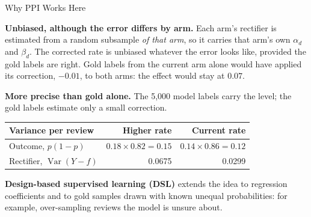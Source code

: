 \documentclass[aspectratio=169, 11pt, handout]{beamer}
\newcommand{\Var}{\operatorname{Var}}
\begin{document}
\begin{frame}{Why PPI Works Here}

\textbf{Unbiased, although the error differs by arm.} Each arm's rectifier is estimated from a random subsample \emph{of that arm}, so it carries that arm's own $\alpha_d$ and $\beta_d$. The corrected rate is unbiased whatever the error looks like, provided the gold labels are right. Gold labels from the current arm alone would have applied its correction, $-0.01$, to both arms: the effect would stay at $0.07$.

\bigskip

\textbf{More precise than gold alone.} The 5{,}000 model labels carry the level; the gold labels estimate only a small correction.

\begin{center}
\small
\begin{tabular}{lrr}
\toprule
\textbf{Variance per review} & \textbf{Higher rate} & \textbf{Current rate} \\
\midrule
Outcome, $p(1-p)$ & $0.18 \times 0.82 = 0.15$ & $0.14 \times 0.86 = 0.12$ \\
Rectifier, $\Var(Y - f)$ & 0.0675 & 0.0299 \\
\bottomrule
\end{tabular}
\end{center}

\medskip

\textbf{Design-based supervised learning (DSL)} extends the idea to regression coefficients and to gold samples drawn with known unequal probabilities: for example, over-sampling reviews the model is unsure about.
\end{frame}
\end{document}
